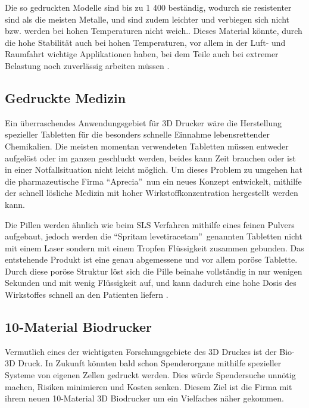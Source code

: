 Die so gedruckten Modelle sind bis zu 1 400 \TEMP beständig, wodurch sie resistenter sind als die meisten Metalle, und sind zudem leichter und verbiegen sich nicht bzw. werden bei hohen Temperaturen nicht weich.. 
Dieses Material könnte, durch die hohe Stabilität auch bei hohen Temperaturen, vor allem in der Luft- und Raumfahrt wichtige Applikationen haben, bei dem Teile auch bei extremer Belastung noch zuverlässig arbeiten müssen \parencite{HiTempCeram}.



\subsection{Gedruckte Medizin}

Ein überraschendes Anwendungsgebiet für 3D Drucker wäre die Herstellung spezieller Tabletten für die besonders schnelle Einnahme lebensrettender Chemikalien. Die meisten momentan verwendeten Tabletten müssen entweder aufgelöst oder im ganzen geschluckt werden, beides kann Zeit brauchen oder ist in einer Notfallsituation nicht leicht möglich. Um dieses Problem zu umgehen hat die pharmazeutische Firma \textquotedblleft Aprecia\textquotedblright ~nun ein neues Konzept entwickelt, mithilfe der schnell lösliche Medizin mit hoher Wirkstoffkonzentration hergestellt werden kann.

Die Pillen werden ähnlich wie beim SLS Verfahren mithilfe eines feinen Pulvers aufgebaut, jedoch werden die \textquotedblleft Spritam levetiracetam\textquotedblright ~genannten Tabletten nicht mit einem Laser sondern mit einem Tropfen Flüssigkeit zusammen gebunden. Das entstehende Produkt ist eine genau abgemessene und vor allem poröse Tablette. Durch diese poröse Struktur löst sich die Pille beinahe vollständig in nur wenigen Sekunden und mit wenig Flüssigkeit auf, und kann dadurch eine hohe Dosis des Wirkstoffes schnell an den Patienten liefern \parencite{Printed_Drug}.

\subsection{10-Material Biodrucker}

Vermutlich eines der wichtigsten Forschungsgebiete des 3D Druckes ist der Bio-3D Druck. In Zukunft könnten bald schon Spenderorgane mithilfe spezieller Systeme von eigenen Zellen gedruckt werden. Dies würde Spendersuche unnötig machen, Risiken minimieren und Kosten senken. Diesem Ziel ist die Firma  mit ihrem neuen 10-Material 3D Biodrucker um ein Vielfaches näher gekommen.

